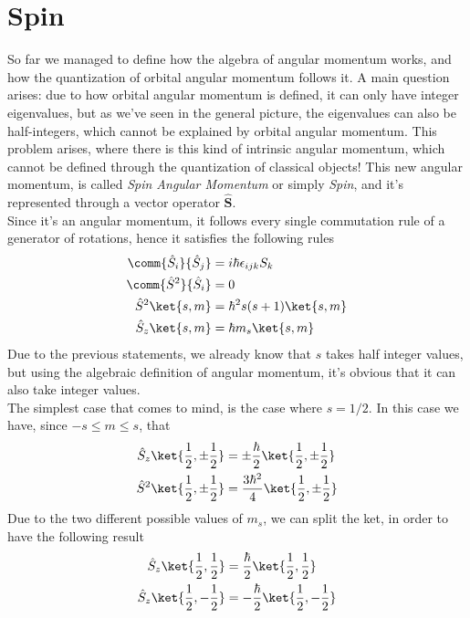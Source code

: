 \documentclass[a4paper, 11pt]{book}
\renewcommand{\vec}[1]{\mathbf{#1}}
\newcommand{\1}{\opr{\mathds{1}}}
\newcommand{\opr}[1]{\hat{#1}}
\newcommand{\lc}[1]{\epsilon_{#1}}
\newcommand{\vecopr}[1]{\opr{\vec{#1}}}
\theoremstyle{plain}
\begin{document}
	\section{Spin}
	So far we managed to define how the algebra of angular momentum works, and how the quantization of orbital angular momentum follows it. A main question arises: due to how orbital angular momentum is defined, it can only have integer eigenvalues, but as we've seen in the general picture, the eigenvalues can also be half-integers, which cannot be explained by orbital angular momentum. This problem arises, where there is this kind of intrinsic angular momentum, which cannot be defined through the quantization of classical objects! This new angular momentum, is called \textit{Spin Angular Momentum} or simply \textit{Spin}, and it's represented through a vector operator $\vecopr{S}$.\\
	Since it's an angular momentum, it follows every single commutation rule of a generator of rotations, hence it satisfies the following rules
	\begin{equation}
		\begin{aligned}
			\comm{\opr{S}_i}{\opr{S}_j}&=i\hbar\lc{ijk}S_k\\
			\comm{\opr{S}^2}{\opr{S}_i}&=0\\
			\opr{S}^2\ket{s,m}&=\hbar^2s(s+1)\ket{s,m}\\
			\opr{S}_z\ket{s,m}&=\hbar m_s\ket{s,m}
		\end{aligned}
		\label{eq:spincomm}
	\end{equation}
	Due to the previous statements, we already know that $s$ takes half integer values, but using the algebraic definition of angular momentum, it's obvious that it can also take integer values.\\
	The simplest case that comes to mind, is the case where $s=1/2$. In this case we have, since $-s\le m\le s$, that
	\begin{equation}
		\begin{aligned}
			\opr{S}_z\ket{\frac{1}{2},\pm\frac{1}{2}}&=\pm\frac{\hbar}{2}\ket{\frac{1}{2},\pm\frac{1}{2}}\\
			\opr{S}^2\ket{\frac{1}{2},\pm\frac{1}{2}}&=\frac{3\hbar^2}{4}\ket{\frac{1}{2},\pm\frac{1}{2}}
		\end{aligned}
		\label{eq:onehalfeigenval}
	\end{equation}
	Due to the two different possible values of $m_s$, we can split the ket, in order to have the following result
	\begin{equation}
		\begin{aligned}
			\opr{S}_z\ket{\frac{1}{2},\frac{1}{2}}&=\frac{\hbar}{2}\ket{\frac{1}{2},\frac{1}{2}}\\
			\opr{S}_z\ket{\frac{1}{2},-\frac{1}{2}}&=-\frac{\hbar}{2}\ket{\frac{1}{2},-\frac{1}{2}}
		\end{aligned}
		\label{eq:szplusminus}
	\end{equation}
\end{document}
